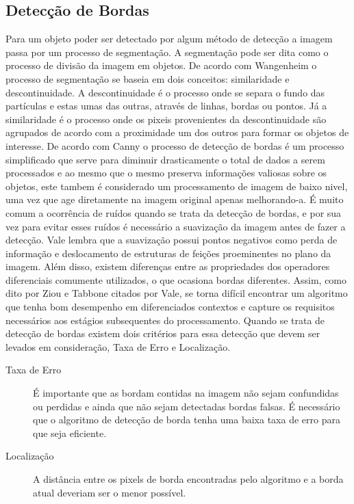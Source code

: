 \subsection{Detecção de Bordas}
Para um objeto poder ser detectado por algum método de detecção a imagem passa por um processo de segmentação. A segmentação pode ser dita como o processo de divisão da imagem em objetos\cite{Gonzalez:2008}. De acordo com Wangenheim\cite{Wangenheim:2014} o processo de segmentação se baseia em dois conceitos: similaridade e descontinuidade. A descontinuidade é o processo onde se separa o fundo das partículas e estas umas das outras, através de linhas, bordas ou pontos. Já a similaridade é o processo onde os pixeis provenientes da descontinuidade são agrupados de acordo com a proximidade um dos outros para formar os objetos de interesse. De acordo com Canny\cite{Canny:1986} o processo de detecção de bordas é um processo simplificado que serve para diminuir drasticamente o total de dados a serem processados e ao mesmo que o mesmo preserva informações valiosas sobre os objetos, este tambem é considerado um processamento de imagem de baixo nivel, uma vez que age diretamente na imagem original apenas melhorando-a. É muito comum a ocorrência de ruídos quando se trata da detecção de bordas, e por sua vez para evitar esses ruídos é necessário a suavização da imagem antes de fazer a detecção. Vale\cite{Vale:2002} lembra que a suavização possui pontos negativos como perda de informação e deslocamento de estruturas de feições proeminentes no plano da imagem. Além disso, existem diferenças entre as propriedades dos operadores diferenciais comumente utilizados, o que ocasiona  bordas diferentes. Assim, como dito por Ziou e Tabbone citados por Vale\cite{Vale:2002}, se torna difícil encontrar um algoritmo que tenha bom desempenho em diferenciados contextos e capture os requisitos necessários aos estágios subsequentes do processamento. 
Quando se trata de detecção de bordas existem dois critérios\cite{Canny:1986} para essa detecção que devem ser levados em consideração, Taxa de Erro e Localização\cite{Vale:2002}. 
\begin{description}
	\item[Taxa de Erro] É importante que as bordam contidas na imagem não sejam confundidas ou perdidas e ainda que não sejam detectadas bordas falsas. É necessário que o algoritmo de detecção de borda tenha uma baixa taxa de erro para que seja eficiente\cite{Wangenheim:2014, Canny:1986, Vale:2002}.
	\item[Localização] A distância entre os pixels de borda encontradas pelo algoritmo e a borda atual deveriam ser o menor possível\cite{Wangenheim:2014}.
\end{description}

